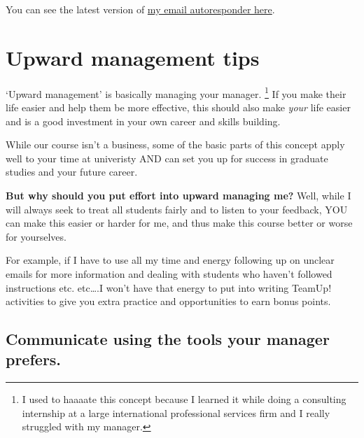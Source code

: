 \documentclass[
]{book}
\begin{document}
You can see the latest version of \href{https://www.lizabolton.com/autoresponder.html}{my email autoresponder here}.

\hypertarget{upward-management-tips}{%
\section{Upward management tips}\label{upward-management-tips}}

`Upward management' is basically managing your manager. \footnote{I used to haaaate this concept because I learned it while doing a consulting internship at a large international professional services firm and I really struggled with my manager.} If you make their life easier and help them be more effective, this should also make \emph{your} life easier and is a good investment in your own career and skills building.

While our course isn't a business, some of the basic parts of this concept apply well to your time at univeristy AND can set you up for success in graduate studies and your future career.

\textbf{But why should you put effort into upward managing me?} Well, while I will always seek to treat all students fairly and to listen to your feedback, YOU can make this easier or harder for me, and thus make this course better or worse for yourselves.

For example, if I have to use all my time and energy following up on unclear emails for more information and dealing with students who haven't followed instructions etc. etc\ldots.I won't have that energy to put into writing TeamUp! activities to give you extra practice and opportunities to earn bonus points.

\hypertarget{communicate-using-the-tools-your-manager-prefers.}{%
\subsection{Communicate using the tools your manager prefers.}\label{communicate-using-the-tools-your-manager-prefers.}}
\end{document}
